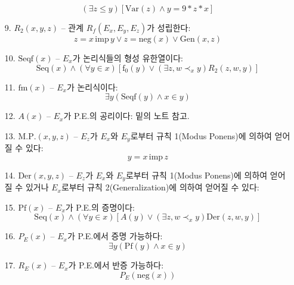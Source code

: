 \documentclass[12pt]{paper}
\begin{document}
\begin{enumerate}
$$ \left( \exists z \le y \right) \left[ \mathrm{Var} \left( z \right) \land y = 9 * z * x \right] $$
\item[{9.}] $R_2 \left( x , y , z \right)$ -- 관계 $R_f \left( E_x , E_y , E_z \right)$가 성립한다:
$$ z = x \, \mathrm{imp} \, y \lor z = \mathrm{neg} \left( x \right) \lor \mathrm{Gen} \left( x , z \right) $$
\item[{10.}] $\mathrm{Seqf} \left( x \right)$ -- $E_x$가 논리식들의 형성 유한열이다:
$$ \mathrm{Seq} \left( x \right) \land \left( \forall y \in x \right) \left[ \mathrm{f}_0 \left( y \right) \lor \left( \exists z , w \prec_x y \right) R_2 \left( z , w , y \right) \right]$$
\item[{11.}] $\mathrm{fm} \left( x \right)$ -- $E_x$가 논리식이다:
$$ \exists y \left( \mathrm{Seqf} \left( y \right) \land x \in y \right) $$
\item[{12.}] $A \left( x \right)$ -- $E_x$가 P.E.의 공리이다: 밑의 노트 참고.
\item[{13.}] $\mathrm{M.P.} \left( x , y , z \right)$ -- $E_z$가 $E_x$와 $E_y$로부터 규칙 1(Modus Ponens)에 의하여 얻어질 수 있다:
$$ y = x \, \mathrm{imp} \, z $$
\item[{14.}] $\mathrm{Der} \left( x , y , z \right)$ -- $E_z$가 $E_x$와 $E_y$로부터 규칙 1(Modus Ponens)에 의하여 얻어질 수 있거나 $E_x$로부터 규칙 2(Generalization)에 의하여 얻어질 수 있다:
\item[{15.}] $\mathrm{Pf} \left( x \right)$ -- $E_x$가 P.E.의 증명이다:
$$ \mathrm{Seq} \left( x \right) \land \left( \forall y \in x \right) \left[ A \left( y \right) \lor \left( \exists z , w \prec_x y \right) \mathrm{Der} \left( z , w , y \right) \right] $$
\item[{16.}] $P_E \left( x \right)$ -- $E_x$가 P.E.에서 증명 가능하다:
$$ \exists y \left( \mathrm{Pf} \left( y \right) \land x \in y \right) $$
\item[{17.}] $R_E \left( x \right)$ -- $E_x$가 P.E.에서 반증 가능하다:
$$ P_E \left( \mathrm {neg} \left( x \right) \right) $$
\end{enumerate}
\end{document}
